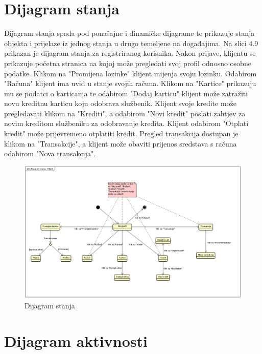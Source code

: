 		\section{Dijagram stanja}
			
			
			
			
			Dijagram stanja spada pod ponašajne i dinamičke dijagrame te prikazuje stanja objekta i prijelaze iz jednog stanja u drugo temeljene na događajima. Na slici 4.9 prikazan je dijagram stanja za registriranog korisnika. Nakon prijave, klijentu se prikazuje početna stranica na kojoj može pregledati svoj profil odnosno osobne podatke. Klikom na "Promijena lozinke" klijent mijenja svoju lozinku. Odabirom "Računa" klijent ima uvid u stanje svojih računa. Klikom na "Kartice" prikazuju mu se podatci o karticama te odabirom "Dodaj karticu" klijent može zatražiti novu kreditnu karticu koju odobrava službenik. Klijent svoje kredite može pregledavati klikom na "Krediti", a odabirom "Novi kredit" poslati zahtjev za novim kreditom službeniku za odobravanje kredita. Klijent odabirom "Otplati kredit" može prijevremeno otplatiti kredit. Pregled transakcija dostupan je klikom na "Transakcije", a klijent može obaviti prijenos sredstava s računa odabirom "Nova transakcija".  
			
			\begin{figure}[H]
				\includegraphics[scale=0.65]{Slike/dijagramStanja.PNG}
				\centering
				\caption{Dijagram stanja}
				\label{fig:dijagram}
			\end{figure}
			
			
			
			\eject
			
		
		\section{Dijagram aktivnosti}
			
